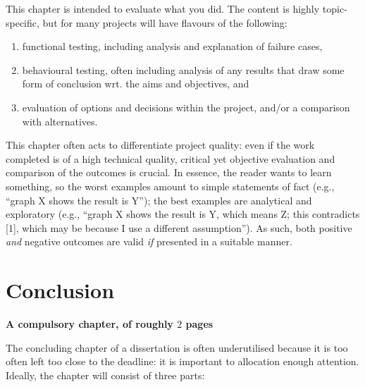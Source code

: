 \documentclass[ %
                    author={Dominic Joseph Moylett},
                    degree={MEng},
                     title={Dictionary Matching with Fingerprints},
                  subtitle={An Empirical Analysis},
                      type={Research},
                      year={2014} ]{dissertation}
\begin{document}
\noindent
This chapter is intended to evaluate what you did.  The content is highly 
topic-specific, but for many projects will have flavours of the following:

\begin{enumerate}
\item functional  testing, including analysis and explanation of failure 
      cases,
\item behavioural testing, often including analysis of any results that 
      draw some form of conclusion wrt. the aims and objectives,
      and
\item evaluation of options and decisions within the project, and/or a
      comparison with alternatives.
\end{enumerate}

\noindent
This chapter often acts to differentiate project quality: even if the work
completed is of a high technical quality, critical yet objective evaluation 
and comparison of the outcomes is crucial.  In essence, the reader wants to
learn something, so the worst examples amount to simple statements of fact 
(e.g., ``graph X shows the result is Y''); the best examples are analytical 
and exploratory (e.g., ``graph X shows the result is Y, which means Z; this 
contradicts [1], which may be because I use a different assumption'').  As 
such, both positive {\em and} negative outcomes are valid {\em if} presented 
in a suitable manner.


\chapter{Conclusion}
\label{chap:conclusion}

{\bf A compulsory chapter, of roughly $2$ pages} 
\vspace{1cm} 

\noindent
The concluding chapter of a dissertation is often underutilised because it 
is too often left too close to the deadline: it is important to allocation
enough attention.  Ideally, the chapter will consist of three parts:
\end{document}
